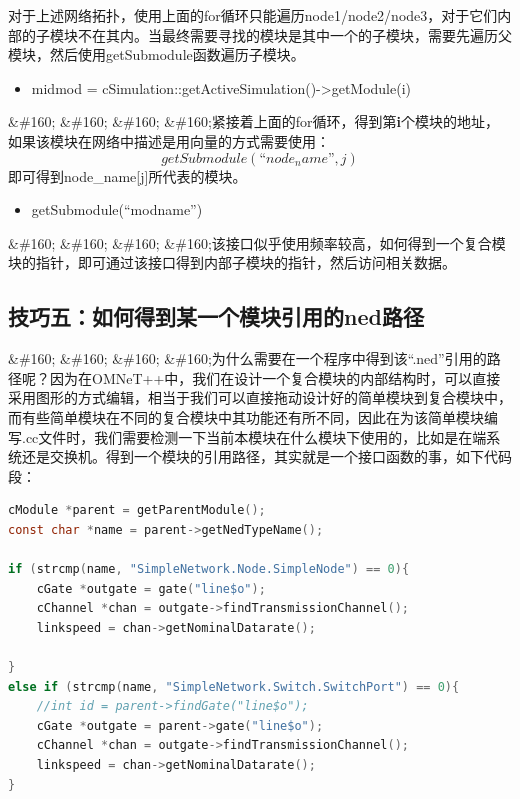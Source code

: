 对于上述网络拓扑，使用上面的for循环只能遍历node1\slash node2\slash node3，对于它们内部的子模块不在其内。当最终需要寻找的模块是其中一个的子模块，需要先遍历父模块，然后使用getSubmodule函数遍历子模块。

\begin{itemize}
\item midmod = cSimulation::getActiveSimulation()->getModule(i)

\end{itemize}

\&\#160; \&\#160; \&\#160; \&\#160;紧接着上面的for循环，得到第\textbf{i}个模块的地址，如果该模块在网络中描述是用向量的方式需要使用：
$$getSubmodule(“node_name”,j)$$
即可得到node\_name{[j]}所代表的模块。

\begin{itemize}
\item getSubmodule(``modname'')

\end{itemize}

\&\#160; \&\#160; \&\#160; \&\#160;该接口似乎使用频率较高，如何得到一个复合模块的指针，即可通过该接口得到内部子模块的指针，然后访问相关数据。

\subsection{技巧五：如何得到某一个模块引用的ned路径}
\label{技巧五：如何得到某一个模块引用的ned路径}

\&\#160; \&\#160; \&\#160; \&\#160;为什么需要在一个程序中得到该``.ned''引用的路径呢？因为在OMNeT++中，我们在设计一个复合模块的内部结构时，可以直接采用图形的方式编辑，相当于我们可以直接拖动设计好的简单模块到复合模块中，而有些简单模块在不同的复合模块中其功能还有所不同，因此在为该简单模块编写.cc文件时，我们需要检测一下当前本模块在什么模块下使用的，比如是在端系统还是交换机。得到一个模块的引用路径，其实就是一个接口函数的事，如下代码段：

\begin{lstlisting}[language=c]
cModule *parent = getParentModule();
const char *name = parent->getNedTypeName();

if (strcmp(name, "SimpleNetwork.Node.SimpleNode") == 0){
    cGate *outgate = gate("line$o");
    cChannel *chan = outgate->findTransmissionChannel();
    linkspeed = chan->getNominalDatarate();

}
else if (strcmp(name, "SimpleNetwork.Switch.SwitchPort") == 0){
    //int id = parent->findGate("line$o");
    cGate *outgate = parent->gate("line$o");
    cChannel *chan = outgate->findTransmissionChannel();
    linkspeed = chan->getNominalDatarate();
}

\end{lstlisting}

